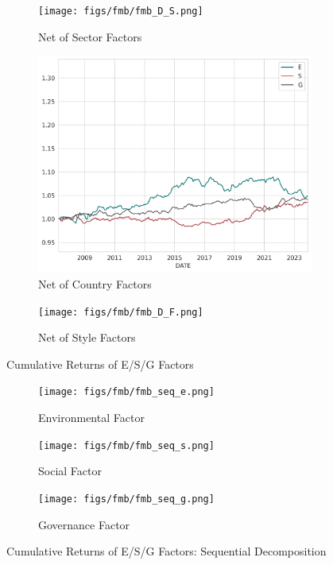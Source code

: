\documentclass[11pt,a4paper]{article}
\begin{document}
\begin{figure}[h!]
    \centering
    \begin{subfigure}{.33\textwidth}
        \centering
        \texttt{[image: figs/fmb/fmb\_D\_S.png]}
        \caption{Net of Sector Factors}
        \label{fig:fmb_D_S}
    \end{subfigure}%
    \begin{subfigure}{.33\textwidth}
      \centering
      \includegraphics[width=1\linewidth]{figs/fmb/fmb_D_C.png}
      \caption{Net of Country Factors}
      \label{fig:fmb_D_C}
    \end{subfigure}%
    \begin{subfigure}{.33\textwidth}
        \centering
        \texttt{[image: figs/fmb/fmb\_D\_F.png]}
        \caption{Net of Style Factors}
        \label{fig:fmb_D_F}
      \end{subfigure}
    \caption{Cumulative Returns of E/S/G Factors}
    \label{fig:fmb_decomp}
\end{figure}

\clearpage

\begin{figure}[h!]
    \centering
    \begin{subfigure}{\textwidth}
        \centering
        \texttt{[image: figs/fmb/fmb\_seq\_e.png]}
        \caption{Environmental Factor}
    \end{subfigure}
    \begin{subfigure}{\textwidth}
      \centering
      \texttt{[image: figs/fmb/fmb\_seq\_s.png]}
      \caption{Social Factor}
    \end{subfigure}
    \begin{subfigure}{\textwidth}
        \centering
        \texttt{[image: figs/fmb/fmb\_seq\_g.png]}
        \caption{Governance Factor}
      \end{subfigure}
    \caption{Cumulative Returns of E/S/G Factors: Sequential Decomposition}
\end{figure}
\end{document}
